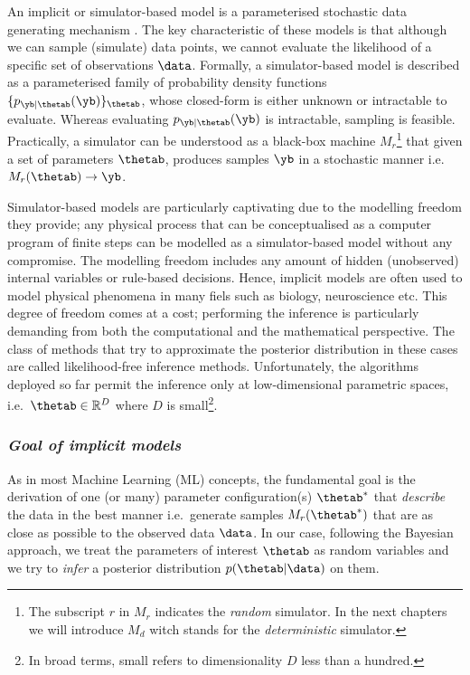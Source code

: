 An implicit or simulator-based model is a parameterised stochastic
data generating mechanism \cite{Gutmann2016}. The key characteristic
of these models is that although we can sample (simulate) data points,
we cannot evaluate the likelihood of a specific set of observations
$\data$. Formally, a simulator-based model is described as a
parameterised family of probability density functions
$\{ p_{\yb|\thetab}(\yb) \}_{\thetab}$, whose closed-form is either
unknown or intractable to evaluate. Whereas evaluating
$p_{\yb|\thetab}(\yb)$ is intractable, sampling is
feasible. Practically, a simulator can be understood as a black-box
machine $M_r$\footnote{The subscript $r$ in $M_r$ indicates the
  \textit{random} simulator. In the next chapters we will introduce
  $M_d$ witch stands for the \textit{deterministic} simulator.} that
given a set of parameters $\thetab$, produces samples $\yb$ in a
stochastic manner i.e.\ $M_r(\thetab) \rightarrow \yb$.

Simulator-based models are particularly captivating due to the
modelling freedom they provide; any physical process that can be
conceptualised as a computer program of finite steps can be modelled
as a simulator-based model without any compromise. The modelling
freedom includes any amount of hidden (unobserved) internal variables
or rule-based decisions. Hence, implicit models are often used to
model physical phenomena in many fiels such as biology, neuroscience
etc. This degree of freedom comes at a cost; performing the inference
is particularly demanding from both the computational and the
mathematical perspective. The class of methods that try to approximate
the posterior distribution in these cases are called likelihood-free
inference methods. Unfortunately, the algorithms deployed so far
permit the inference only at low-dimensional parametric spaces,
i.e.\ $\thetab \in \mathbb{R}^D$ where $D$ is small\footnote{In broad terms, small refers to dimensionality $D$ less than a hundred.}.

\subsubsection*{\textit{Goal of implicit models}}

As in most Machine Learning (ML) concepts, the fundamental goal is the
derivation of one (or many) parameter configuration(s) $\thetab^*$
that \textit{describe} the data in the best manner i.e.\ generate
samples $M_r(\thetab^*)$ that are as close as possible to the observed
data $\data$. In our case, following the Bayesian approach, we treat
the parameters of interest $\thetab$ as random variables and we try to
\textit{infer} a posterior distribution $p(\thetab|\data)$ on them.
